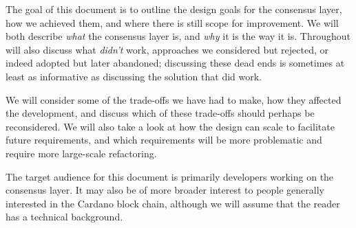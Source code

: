 The goal of this document is to outline the design goals for the consensus
layer, how we achieved them, and where there is still scope for improvement. We
will both describe \emph{what} the consensus layer is, and \emph{why} it is the
way it is. Throughout will also discuss what \emph{didn't} work, approaches we
considered but rejected, or indeed adopted but later abandoned; discussing these
dead ends is sometimes at least as informative as discussing the solution that
did work.

We will consider some of the trade-offs we have had to make, how they
affected the development, and discuss which of these trade-offs should perhaps
be reconsidered. We will also take a look at how the design can scale to
facilitate future requirements, and which requirements will be more problematic
and require more large-scale refactoring.

The target audience for this document is primarily developers working on the
consensus layer. It may also be of more broader interest to people generally
interested in the Cardano block chain, although we will assume that the
reader has a technical background.
